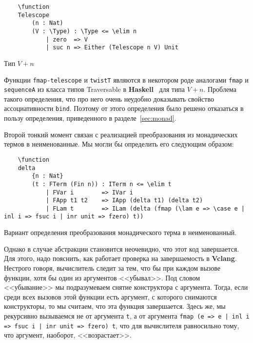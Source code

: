 \begin{listing}[H]
  \begin{verbatim}
    \function
    Telescope
        (n : Nat)
        (V : \Type) : \Type <= \elim n
            | zero  => V
            | suc n => Either (Telescope n V) Unit
  \end{verbatim}
  \caption{Тип $V + n$}
\end{listing}

Функции \texttt{fmap-telescope} и \texttt{twistT} являются в некотором роде аналогами \texttt{fmap} и \texttt{sequenceA} из класса типов Traversable в \textbf{Haskell}~\cite{traversable} для типа $V + n$. Проблема такого определения, что про него очень неудобно доказывать свойство ассоциативности \texttt{bind}. Поэтому от этого определения было решено отказаться в пользу определения, приведенного в разделе~\ref{sec:monad}.

Второй тонкий момент связан с реализацией преобразования из монадических термов в неименованные. Мы могли бы определить его следующим образом:

\begin{listing}[H]
  \begin{verbatim}
    \function
    delta
        {n : Nat}
        (t : FTerm (Fin n)) : ITerm n <= \elim t
            | FVar i        => IVar i
            | FApp t1 t2    => IApp (delta t1) (delta t2)
            | FLam t        => ILam (delta (fmap (\lam e => \case e | inl i => fsuc i | inr unit => fzero) t))
  \end{verbatim}
  \caption{Вариант определения преобразования монадического терма в неименованный.}
\end{listing}

Однако в случае абстракции становится неочевидно, что этот код завершается. Для этого, надо пояснить, как работает проверка на завершаемость в \textbf{Vclang}. Нестрого говоря, вычислитель следит за тем, что бы при каждом вызове функции, хотя бы один из аргументов <<убывал>>. Под словом <<убывание>> мы подразумеваем снятие конструктора с аргумента. Тогда, если среди всех вызовов этой функции есть аргумент, с которого снимаются конструкторы, то мы считаем, что эта функция завершается. Здесь же, мы рекурсивно вызываемся не от аргумента \texttt{t}, а от аргумента \texttt{fmap (\lam e => \case e | inl i => fsuc i | inr unit => fzero) t}, что для вычислителя равносильно тому, что аргумент, наоборот, <<возрастает>>.

